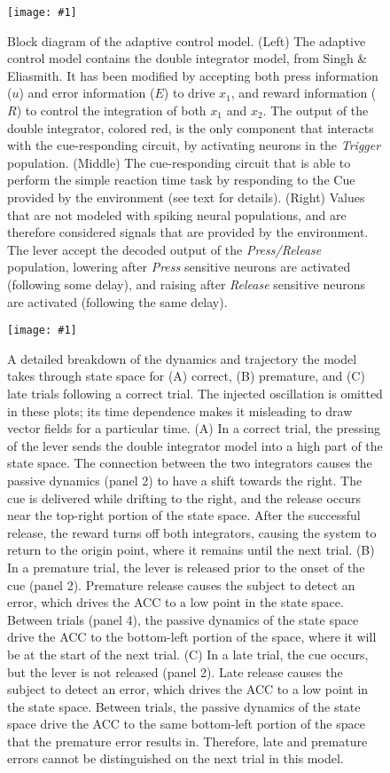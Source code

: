 \documentclass[11pt]{article}
\newcommand{\scalefigone}[3]{
  \begin{figure}[ht!]
    \centering
    \texttt{[image: \#1]}
    \caption{#3}
    \label{#1}
  \end{figure}}
\begin{document}
\scalefigone{fig4}{0.8}{
  Block diagram of the adaptive control model.
  (Left) The adaptive control model contains
  the double integrator model,
  from Singh \& Eliasmith.
  It has been modified by accepting
  both press information ($u$)
  and error information ($E$)
  to drive $x_1$, and
  reward information ($R$)
  to control the integration
  of both $x_1$ and $x_2$.
  The output of the double integrator,
  colored red, is the only component
  that interacts with the cue-responding
  circuit, by activating neurons
  in the \textit{Trigger} population.
  (Middle) The cue-responding circuit
  that is able to perform
  the simple reaction time task
  by responding to the Cue
  provided by the environment
  (see text for details).
  (Right) Values that are not modeled
  with spiking neural populations,
  and are therefore considered
  signals that are provided by the environment.
  The lever accept the decoded
  output of the \textit{Press/Release} population,
  lowering after \textit{Press} sensitive
  neurons are activated (following some delay),
  and raising after \textit{Release} sensitive
  neurons are activated (following the same delay).
}

\scalefigone{fig5}{1.0}{
  A detailed breakdown of the dynamics and
  trajectory the model takes through state space
  for (A) correct, (B) premature, and (C) late trials
  following a correct trial.
  The injected oscillation is omitted
  in these plots;
  its time dependence makes it misleading
  to draw vector fields for a particular time.
  (A) In a correct trial, the pressing of the lever
  sends the double integrator model into
  a high part of the state space.
  The connection between the two integrators
  causes the passive dynamics (panel 2)
  to have a shift towards the right.
  The cue is delivered while drifting
  to the right, and the release occurs
  near the top-right portion of the state space.
  After the successful release,
  the reward turns off both integrators,
  causing the system to return to the origin point,
  where it remains until the next trial.
  (B) In a premature trial, the lever is released
  prior to the onset of the cue (panel 2).
  Premature release causes the subject
  to detect an error, which drives
  the ACC to a low point in the state space.
  Between trials (panel 4),
  the passive dynamics of the state space
  drive the ACC to the bottom-left portion
  of the space, where it will be
  at the start of the next trial.
  (C) In a late trial, the cue occurs,
  but the lever is not released (panel 2).
  Late release causes the subject
  to detect an error, which drives the ACC
  to a low point in the state space.
  Between trials, the passive dynamics
  of the state space drive the ACC
  to the same bottom-left portion of the space
  that the premature error results in.
  Therefore, late and premature errors
  cannot be distinguished on the next trial
  in this model.
}
\end{document}
